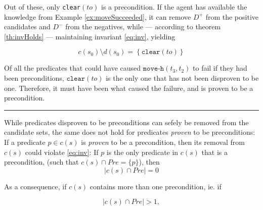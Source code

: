 \documentclass[../../Master.tex]{subfiles}
\begin{document}
\begin{example}
    Out of these, only \texttt{clear}$(to)$ is a precondition. If the agent has available the knowledge from Example \ref{ex:moveSucceeded}, it can remove $D^+$ from the positive candidates and $D^-$ from the negatives, while --- according to theorem \ref{th:invHolds} --- maintaining invariant \eqref{eq:inv}, yielding

    \begin{equation}
        c(s_0) \setminus d(s_0) = \left\{ \texttt{clear}(to) \right\}
    \end{equation}


    Of all the predicates that could have caused $\texttt{move-h}(t_3, t_2)$ to fail if they had been preconditions, $\texttt{clear}(to)$ is the only one that has not been disproven to be one. Therefore, it must have been what caused the failure, and is proven to be a precondition.

    \noindent\rule{\textwidth}{1pt}
\end{example}

While predicates disproven to be preconditions can sefely be removed from the candidate sets, the same does not hold for predicates \emph{proven} to be preconditions:
If a predicate $p \in c(s)$ is \textit{proven} to be a precondition, then its removal from $c(s)$ could violate \eqref{eq:inv}: If $p$ is the only predicate in $c(s)$ that is a precondition, (such that $c(s) \cap Pre = \{ p \}$), then
\begin{equation*}
    \left| c(s) \cap Pre \right| = 0
\end{equation*}

As a consequence, if $c(s)$ contains more than one precondition, ie. if

\begin{equation*}
    \left| c(s) \cap Pre \right| > 1,
\end{equation*}
\end{document}
